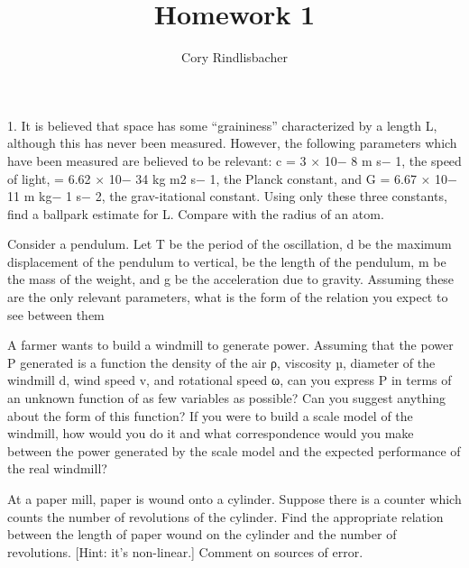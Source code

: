 \documentclass[12pt]{article}
\newenvironment{exercise}[2][Exercise]{\begin{trivlist}
\item[\hskip \labelsep {\bfseries #1}\hskip \labelsep {\bfseries #2.}]}{\end{trivlist}}
\begin{document}
 
 
 
\title{Homework 1}%
\author{Cory Rindlisbacher\\ %
} %
 
\maketitle
 
\begin{exercise}{1} %
1. It is believed that space has some “graininess” characterized by a length L, although this has never been measured. However, the following parameters which have been measured are believed to be relevant: c = 3 × 10− 8 m s− 1, the speed of light, = 6.62 × 10− 34 kg m2 s− 1, the Planck constant, and G = 6.67 × 10− 11 m kg− 1 s− 2, the grav-itational constant. Using only these three constants, ﬁnd a ballpark estimate for L. Compare with the radius of an atom.

\end{exercise}
 
\begin{exercise}{2}
Consider a pendulum. Let T be the period of the oscillation, d be the maximum displacement of the pendulum to vertical,  be the length of the pendulum, m be the mass of the weight, and g be the acceleration due to gravity. Assuming these are the only relevant parameters, what is the form of the relation you expect to see between them
\end{exercise}

\begin{exercise}{3}
A farmer wants to build a windmill to generate power. Assuming that the power P
generated is a function the density of the air ρ, viscosity µ, diameter of the windmill d, wind speed v, and rotational speed ω, can you express P in terms of an unknown function of as few variables as possible? Can you suggest anything about the form of this function? If you were to build a scale model of the windmill, how would you do it and what correspondence would you make between the power generated by the scale model and the expected performance of the real windmill?
\end{exercise}

\begin{exercise}{4}
At a paper mill, paper is wound onto a cylinder. Suppose there is a counter which counts the number of revolutions of the cylinder. Find the appropriate relation between the length of paper wound on the cylinder and the number of revolutions. [Hint: it’s non-linear.] Comment on sources of error.
\end{exercise}

 
\end{document}
